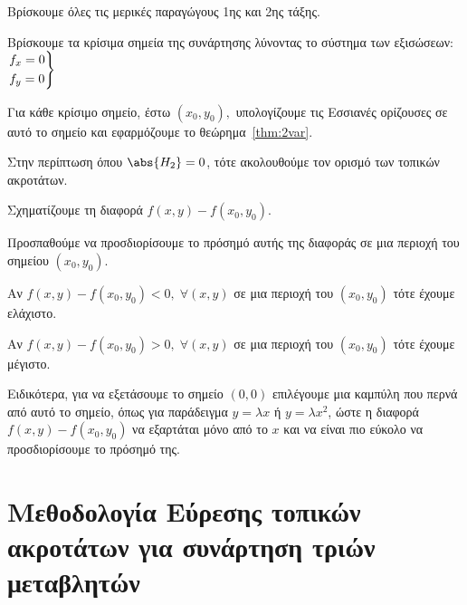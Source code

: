 \begin{enumerate}
  \item Βρίσκουμε όλες τις μερικές παραγώγους 1ης και 2ης τάξης.
  \item Βρίσκουμε τα κρίσιμα σημεία της συνάρτησης λύνοντας το σύστημα των εξισώσεων: 
    $ \begin{rcases}
      f_{x} = 0 \\
      f_{y} = 0  
    \end{rcases} $
  \item Για κάθε κρίσιμο σημείο, έστω $ (x_{0}, y_{0}), $ υπολογίζουμε τις Εσσιανές 
    ορίζουσες σε αυτό το σημείο και εφαρμόζουμε το θεώρημα~\ref{thm:2var}.
  \item Στην περίπτωση όπου $ \abs{H_{2}} = 0 $, τότε ακολουθούμε τον ορισμό των 
    τοπικών ακροτάτων.
    \begin{myitemize}
      \item Σχηματίζουμε τη διαφορά $ f(x,y) - f(x_{0}, y_{0}) $.
      \item Προσπαθούμε να προσδιορίσουμε το πρόσημό αυτής της διαφοράς σε 
        μια περιοχή του σημείου $ (x_{0}, y_{0}) $.
        \begin{myitemize}
          \item Αν $ f(x,y) - f(x_{0}, y_{0}) < 0, \; \forall (x,y) $ σε μια
            περιοχή του $ (x_{0}, y_{0}) $ τότε έχουμε ελάχιστο. 
          \item Αν $ f(x,y) - f(x_{0}, y_{0}) > 0, \; \forall (x,y) $ σε μια
            περιοχή του $ (x_{0}, y_{0}) $ τότε έχουμε μέγιστο. 
        \end{myitemize}
      \item Ειδικότερα, για να εξετάσουμε το σημείο $ (0,0) $ επιλέγουμε μια 
        καμπύλη που περνά από αυτό το σημείο, όπως για παράδειγμα 
        $ y= \lambda x $ ή $ y= \lambda x^{2} $, ώστε η διαφορά 
        $ f(x,y) - f(x_{0}, y_{0}) $ να εξαρτάται μόνο από το $x$ και να 
        είναι πιο εύκολο να προσδιορίσουμε το πρόσημό της.
    \end{myitemize}
\end{enumerate}

\section{Μεθοδολογία Εύρεσης τοπικών ακροτάτων για συνάρτηση τριών μεταβλητών}

